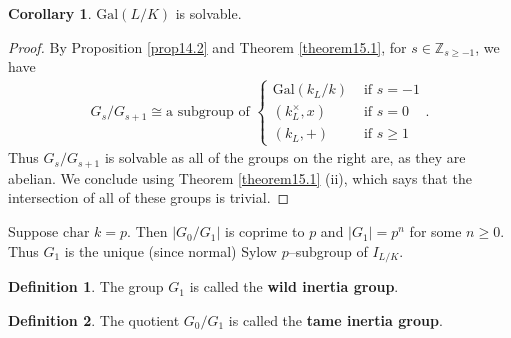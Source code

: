 \documentclass{article}
\theoremstyle{definition}
\newtheorem{cor}[theorem]{Corollary}
\newtheorem{defn}{Definition}[section]
\begin{document}
\begin{cor}
    $\text{Gal}(L/K)$ is solvable.
\end{cor}
\begin{proof}
    By Proposition \ref{prop14.2} and Theorem \ref{theorem15.1}, for $s \in \mathbb{Z}_{s \ge -1}$, we have 
    \begin{align*}
        G_s/G_{s+1} \cong \text{a subgroup of } \begin{cases}
            \text{Gal}(k_L/k) &\text{ if }s = -1\\
            (k_L^\times,x) & \text{ if }s=0\\
            (k_L, +) &\text{ if }s\ge 1
        \end{cases}.
    \end{align*}
    Thus $G_s/G_{s+1}$ is solvable as all of the groups on the right are, as they are abelian. We conclude using Theorem \ref{theorem15.1} (ii), which says that the intersection of all of these groups is trivial.
\end{proof}
Suppose $\text{char }k = p$. Then $|G_0/G_1|$ is coprime to $p$ and $|G_1| = p^n$ for some $n\ge 0$. Thus $G_1$ is the unique (since normal) Sylow $p$--subgroup of $I_{L/K}$.
\begin{defn}
    The group $G_1$ is called the \textbf{wild inertia group}.
\end{defn}
\begin{defn}
    The quotient $G_0/G_1$ is called the \textbf{tame inertia group}.
\end{defn}
\end{document}
